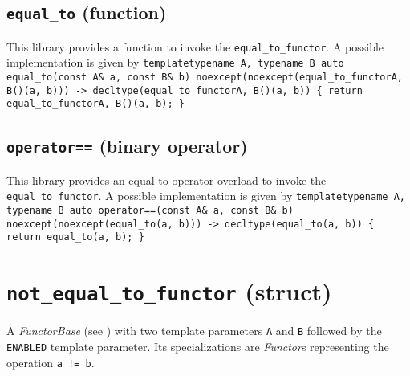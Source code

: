 \documentclass[oneside]{book}
\begin{document}
\subsection{\texttt{equal\_to} (function)}
This library provides a function to invoke the \texttt{equal\_to\_functor}.
A possible implementation is given by\newline
\texttt{template\textlangle typename A, typename B\textrangle\newline
auto\newline
equal\_to(const A\& a, const B\& b)\newline
noexcept(noexcept(equal\_to\_functor\textlangle A, B\textrangle()(a, b)))\newline
-> decltype(equal\_to\_functor\textlangle A, B\textrangle()(a, b))\newline
\{ return equal\_to\_functor\textlangle A, B\textrangle()(a, b); \}}

\subsection{\texttt{operator==} (binary operator)}
This library provides an equal to operator overload to invoke the \texttt{equal\_to\_functor}.
A possible implementation is given by\newline
\texttt{template\textlangle typename A, typename B\textrangle\newline
auto\newline
operator==(const A\& a, const B\& b)\newline
noexcept(noexcept(equal\_to(a, b)))\newline
-> decltype(equal\_to(a, b))\newline
\{ return equal\_to(a, b); \}}

\section{\texttt{not\_equal\_to\_functor} (struct)}
A \textit{FunctorBase} (see \cite{functors}) with two template parameters \texttt{A} and \texttt{B} followed by the \texttt{ENABLED} template parameter.
Its specializations are \textit{Functor}s representing the operation \texttt{a != b}.
\end{document}
